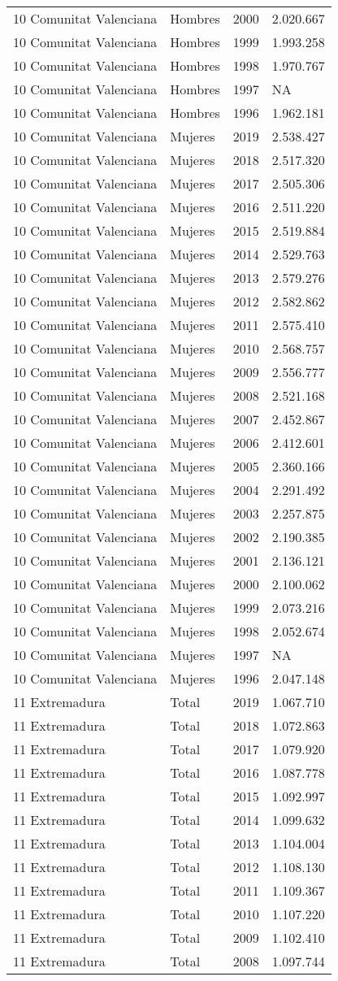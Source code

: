 \documentclass[
]{article}
\begin{document}
\begin{longtable}[]{@{}llrl@{}}
10 Comunitat Valenciana & Hombres & 2000 & 2.020.667\tabularnewline
10 Comunitat Valenciana & Hombres & 1999 & 1.993.258\tabularnewline
10 Comunitat Valenciana & Hombres & 1998 & 1.970.767\tabularnewline
10 Comunitat Valenciana & Hombres & 1997 & NA\tabularnewline
10 Comunitat Valenciana & Hombres & 1996 & 1.962.181\tabularnewline
10 Comunitat Valenciana & Mujeres & 2019 & 2.538.427\tabularnewline
10 Comunitat Valenciana & Mujeres & 2018 & 2.517.320\tabularnewline
10 Comunitat Valenciana & Mujeres & 2017 & 2.505.306\tabularnewline
10 Comunitat Valenciana & Mujeres & 2016 & 2.511.220\tabularnewline
10 Comunitat Valenciana & Mujeres & 2015 & 2.519.884\tabularnewline
10 Comunitat Valenciana & Mujeres & 2014 & 2.529.763\tabularnewline
10 Comunitat Valenciana & Mujeres & 2013 & 2.579.276\tabularnewline
10 Comunitat Valenciana & Mujeres & 2012 & 2.582.862\tabularnewline
10 Comunitat Valenciana & Mujeres & 2011 & 2.575.410\tabularnewline
10 Comunitat Valenciana & Mujeres & 2010 & 2.568.757\tabularnewline
10 Comunitat Valenciana & Mujeres & 2009 & 2.556.777\tabularnewline
10 Comunitat Valenciana & Mujeres & 2008 & 2.521.168\tabularnewline
10 Comunitat Valenciana & Mujeres & 2007 & 2.452.867\tabularnewline
10 Comunitat Valenciana & Mujeres & 2006 & 2.412.601\tabularnewline
10 Comunitat Valenciana & Mujeres & 2005 & 2.360.166\tabularnewline
10 Comunitat Valenciana & Mujeres & 2004 & 2.291.492\tabularnewline
10 Comunitat Valenciana & Mujeres & 2003 & 2.257.875\tabularnewline
10 Comunitat Valenciana & Mujeres & 2002 & 2.190.385\tabularnewline
10 Comunitat Valenciana & Mujeres & 2001 & 2.136.121\tabularnewline
10 Comunitat Valenciana & Mujeres & 2000 & 2.100.062\tabularnewline
10 Comunitat Valenciana & Mujeres & 1999 & 2.073.216\tabularnewline
10 Comunitat Valenciana & Mujeres & 1998 & 2.052.674\tabularnewline
10 Comunitat Valenciana & Mujeres & 1997 & NA\tabularnewline
10 Comunitat Valenciana & Mujeres & 1996 & 2.047.148\tabularnewline
11 Extremadura & Total & 2019 & 1.067.710\tabularnewline
11 Extremadura & Total & 2018 & 1.072.863\tabularnewline
11 Extremadura & Total & 2017 & 1.079.920\tabularnewline
11 Extremadura & Total & 2016 & 1.087.778\tabularnewline
11 Extremadura & Total & 2015 & 1.092.997\tabularnewline
11 Extremadura & Total & 2014 & 1.099.632\tabularnewline
11 Extremadura & Total & 2013 & 1.104.004\tabularnewline
11 Extremadura & Total & 2012 & 1.108.130\tabularnewline
11 Extremadura & Total & 2011 & 1.109.367\tabularnewline
11 Extremadura & Total & 2010 & 1.107.220\tabularnewline
11 Extremadura & Total & 2009 & 1.102.410\tabularnewline
11 Extremadura & Total & 2008 & 1.097.744\tabularnewline

\end{longtable}
\end{document}
